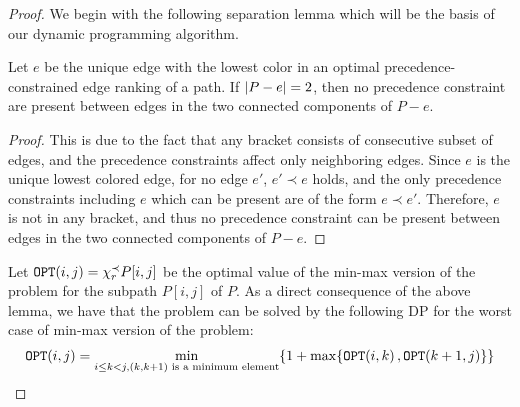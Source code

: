 \begin{proof}
    We begin with the following separation lemma which will be the basis of our dynamic programming algorithm.

    \begin{lemma}\label{lemma:separation}
        Let $e$ be the unique edge with the lowest color in an optimal precedence-constrained edge ranking of a path. If $\mathopen{}\left| P-e \right|=2$, then no precedence constraint are present between edges in the two connected components of $P-e$. 
    \end{lemma}
    \begin{proof}
         This is due to the fact that any bracket consists of consecutive subset of edges, and the precedence constraints affect only neighboring edges. Since $e$ is the unique lowest colored edge, for no edge $e'$, $e'\prec e$ holds, and the only precedence constraints including $e$ which can be present are of the form $e\prec e'$. Therefore, $e$ is not in any bracket, and thus no precedence constraint can be present between edges in the two connected components of $P-e$.
    \end{proof}
Let $\texttt{OPT}\mathopen{}\left( i,j \right)=\chi_r^{\prec}{P[i,j]}$ be the optimal value of the min-max version of the problem for the subpath $P[i,j]$ of $P$.
As a direct consequence of the above lemma, we have that the problem can be solved by the following DP for the worst case of min-max version of the problem:
\begin{align*}
\texttt{OPT}\mathopen{}\left( i,j \right) = \min_{i\leq k < j,(k,k+1) \text{ is a minimum element}}\mathopen{}\left\{ 1+\max\mathopen{}\left\{ \texttt{OPT}\mathopen{}\left( i, k \right), \texttt{OPT}\mathopen{}\left( k+1, j \right) \right\} \right\}
\end{align*}


\end{proof}
